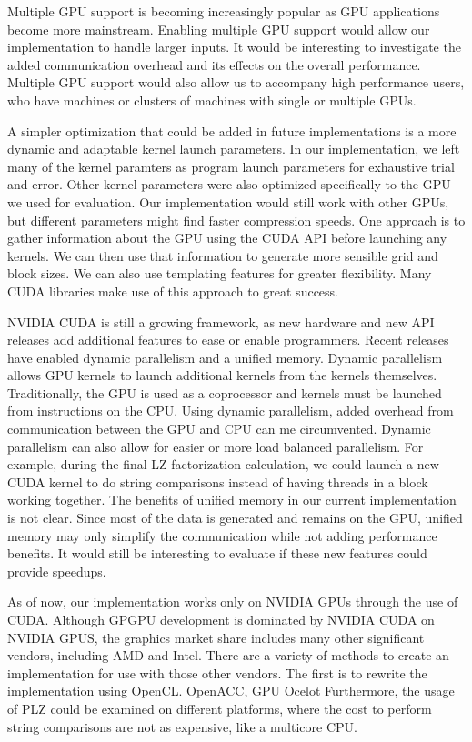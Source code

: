 Multiple GPU support is becoming increasingly popular as GPU applications become more mainstream.
Enabling multiple GPU support would allow our implementation to handle larger inputs.
It would be interesting to investigate the added communication overhead and its effects on the overall performance.
Multiple GPU support would also allow us to accompany high performance users, who have machines or clusters of machines with single or multiple GPUs.

A simpler optimization that could be added in future implementations is a more dynamic and adaptable kernel launch parameters.
In our implementation, we left many of the kernel paramters as program launch parameters for exhaustive trial and error.
Other kernel parameters were also optimized specifically to the GPU we used for evaluation.
Our implementation would still work with other GPUs, but different parameters might find faster compression speeds.
One approach is to gather information about the GPU using the CUDA API before launching any kernels.
We can then use that information to generate more sensible grid and block sizes.
We can also use templating features for greater flexibility.
Many CUDA libraries make use of this approach to great success.

NVIDIA CUDA is still a growing framework, as new hardware and new API releases add additional features to ease or enable programmers.
Recent releases have enabled dynamic parallelism and a unified memory.
Dynamic parallelism allows GPU kernels to launch additional kernels from the kernels themselves.
Traditionally, the GPU is used as a coprocessor and kernels must be launched from instructions on the CPU.
Using dynamic parallelism, added overhead from communication between the GPU and CPU can me circumvented.
Dynamic parallelism can also allow for easier or more load balanced parallelism.
For example, during the final LZ factorization calculation, we could launch a new CUDA kernel to do string comparisons instead of having threads in a block working together.
The benefits of unified memory in our current implementation is not clear.
Since most of the data is generated and remains on the GPU, unified memory may only simplify the communication while not adding performance benefits.
It would still be interesting to evaluate if these new features could provide speedups.

As of now, our implementation works only on NVIDIA GPUs through the use of CUDA.
Although GPGPU development is dominated by NVIDIA CUDA on NVIDIA GPUS, the graphics market share includes many other significant vendors, including AMD and Intel.
There are a variety of methods to create an implementation for use with those other vendors.
The first is to rewrite the implementation using OpenCL.
OpenACC, GPU Ocelot
Furthermore, the usage of PLZ could be examined on different platforms, where the cost to perform string comparisons are not as expensive, like a multicore CPU.

